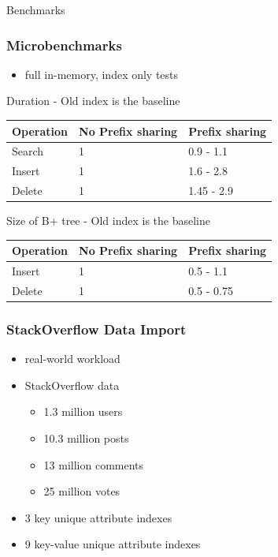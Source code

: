 \documentclass{beamer}
\begin{document}
  \begin{section}{Benchmarks}
    
    \begin{frame}
      \frametitle{Microbenchmarks}
        \begin{itemize}
        \item full in-memory, index only tests
        \end{itemize}
        \pause
        \begin{block}{Duration - Old index is the baseline}
        
        \end{block}
       \begin{tabular}{| l | l | l |}
        \hline
        Operation & No Prefix sharing & Prefix sharing \\ \hline 
        Search & 1 & 0.9 - 1.1  \\ \hline 
        Insert & 1 & 1.6 - 2.8  \\ \hline 
        Delete & 1 & 1.45 - 2.9  \\ \hline 
      \end{tabular}
        \pause
        \begin{block}{
        Size of B+ tree - Old index is the baseline}
        \end{block}
       \begin{tabular}{| l | l | l |}
        \hline
        Operation & No Prefix sharing & Prefix sharing \\ \hline 
        Insert & 1 & 0.5 - 1.1  \\ \hline 
        Delete & 1 & 0.5 - 0.75  \\ \hline 
      \end{tabular}
    \end{frame}

    \begin{frame}
      \frametitle{StackOverflow Data Import}
        \begin{itemize}
        \item real-world workload 
        \item StackOverflow data 
            \begin{itemize}
            \item 1.3 million users
            \item 10.3 million posts
            \item 13 million comments
            \item 25 million votes  
            \end{itemize}  
        \item 3 key unique attribute indexes 
        \item 9 key-value unique attribute indexes
        \end{itemize}
    \end{frame}
    

\end{section}
\end{document}
